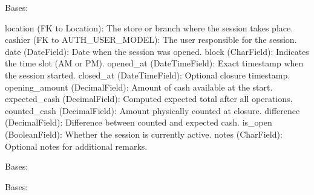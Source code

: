 \documentclass[a4paper,11pt,spanish]{sphinxmanual}
\begin{document}
\begin{fulllineitems}
\label{\detokenize{api/CashRegister/CashRegister.models:CashRegister.models.CashSession}}
\pysigstartsignatures
\pysiglinewithargsret
{}
{\sphinxparamcomma {}}
{}
\pysigstopsignatures
\sphinxAtStartPar
Bases: 
\begin{description}
\sphinxAtStartPar
location (FK to Location): The store or branch where the session takes place.
cashier (FK to AUTH\_USER\_MODEL): The user responsible for the session.
date (DateField): Date when the session was opened.
block (CharField): Indicates the time slot (AM or PM).
opened\_at (DateTimeField): Exact timestamp when the session started.
closed\_at (DateTimeField): Optional closure timestamp.
opening\_amount (DecimalField): Amount of cash available at the start.
expected\_cash (DecimalField): Computed expected total after all operations.
counted\_cash (DecimalField): Amount physically counted at closure.
difference (DecimalField): Difference between counted and expected cash.
is\_open (BooleanField): Whether the session is currently active.
notes (CharField): Optional notes for additional remarks.

\end{description}

\begin{fulllineitems}
\label{\detokenize{api/CashRegister/CashRegister.models:CashRegister.models.CashSession.DoesNotExist}}
\pysigstartsignatures
\pysigline
{}
\pysigstopsignatures
\sphinxAtStartPar
Bases: 

\end{fulllineitems}


\begin{fulllineitems}
\label{\detokenize{api/CashRegister/CashRegister.models:CashRegister.models.CashSession.MultipleObjectsReturned}}
\pysigstartsignatures
\pysigline
{}
\pysigstopsignatures
\sphinxAtStartPar
Bases: 


\end{fulllineitems}
\end{fulllineitems}
\end{document}
